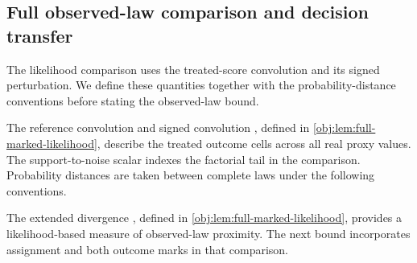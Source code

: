 \documentclass[11pt]{article}
\begin{document}
\subsection{Full observed-law comparison and decision transfer}

The likelihood comparison uses the treated-score convolution and its signed perturbation. We define these quantities together with the probability-distance conventions before stating the observed-law bound.



The reference convolution  and signed convolution , defined in \cref{obj:lem:full-marked-likelihood}, describe the treated outcome cells across all real proxy values. The support-to-noise scalar  indexes the factorial tail in the comparison. Probability distances are taken between complete laws under the following conventions.



The extended divergence , defined in \cref{obj:lem:full-marked-likelihood}, provides a likelihood-based measure of observed-law proximity. The next bound incorporates assignment and both outcome marks in that comparison.
\end{document}
